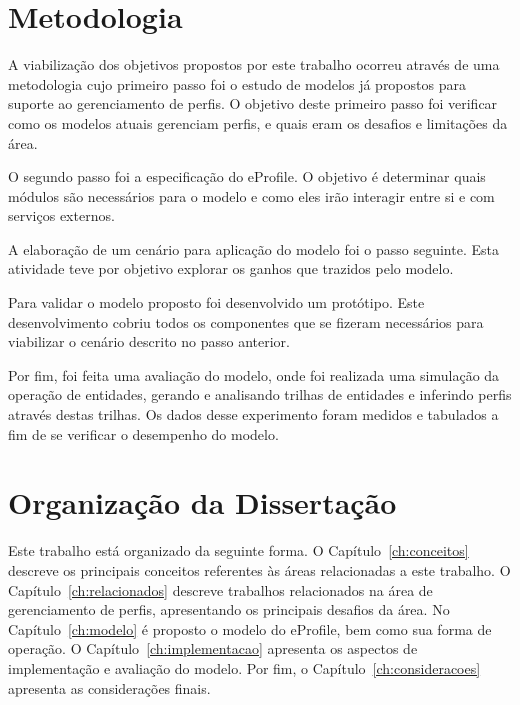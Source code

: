 
\section{Metodologia}
\label{sec:metodologia}

A viabilização dos objetivos propostos por este trabalho ocorreu através de uma metodologia cujo primeiro passo foi o estudo de modelos já propostos para suporte ao gerenciamento de perfis. O objetivo deste primeiro passo foi verificar como os modelos atuais gerenciam perfis, e quais eram os desafios e limitações da área.

O segundo passo foi a especificação do eProfile. O objetivo é determinar quais módulos são necessários para o modelo e como eles irão interagir entre si e com serviços externos.

A elaboração de um cenário para aplicação do modelo foi o passo seguinte. Esta atividade teve por objetivo explorar os ganhos que trazidos pelo modelo.

Para validar o modelo proposto foi desenvolvido um protótipo. Este desenvolvimento cobriu todos os componentes que se fizeram necessários para viabilizar o cenário descrito no passo anterior.

Por fim, foi feita uma avaliação do modelo, onde foi realizada uma simulação da operação de entidades, gerando e analisando trilhas de entidades e inferindo perfis através destas trilhas. Os dados desse experimento foram medidos e tabulados a fim de se verificar o desempenho do modelo.


\section{Organização da Dissertação}
\label{sec:organizacao}

Este trabalho está organizado da seguinte forma. O Capítulo~\ref{ch:conceitos} descreve os principais conceitos referentes às áreas relacionadas a este trabalho. O Capítulo~\ref{ch:relacionados} descreve trabalhos relacionados na área de gerenciamento de perfis, apresentando os principais desafios da área. No Capítulo~\ref{ch:modelo} é proposto o modelo do eProfile, bem como sua forma de operação. O Capítulo~\ref{ch:implementacao} apresenta os aspectos de implementação e avaliação do modelo. Por fim, o Capítulo~\ref{ch:consideracoes} apresenta as considerações finais.
